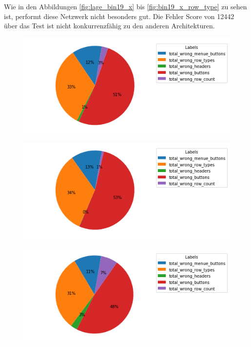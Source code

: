 \documentclass[pdftex,a4paper,halfparskip, article]{scrartcl}
\begin{document}
Wie in den Abbildungen \ref{fig:lage_bin19_x} bis \ref{fig:bin19_x_row_type} zu sehen ist, performt diese Netzwerk nicht besonders gut. Die Fehler Score von 12442 über das Test ist nicht konkurrenzfähig zu den anderen Architekturen.

\begin{figure}
\centering
\begin{minipage}{.5\textwidth}
  \centering
  \includegraphics[width=1\linewidth]{predictions_bin19_x_total_error_types_pie_chart}
  \label{fig:fehler_gesamt_bin19_x}
\end{minipage}%
\begin{minipage}{.5\textwidth}
  \centering
  \includegraphics[width=1\linewidth]{predictions_bin19_x_excluded_p80_error_types_pie_chart}
  \label{fig:fehler_beste80_bin19_x}
\end{minipage}
\begin{minipage}{.5\textwidth}
  \centering
   \includegraphics[width=1\linewidth]{predictions_bin19_x_p80_error_types_pie_chart}
  \label{fig:fehler_schlechteste20_bin19_x}
\end{minipage}
\end{figure}
\end{document}
